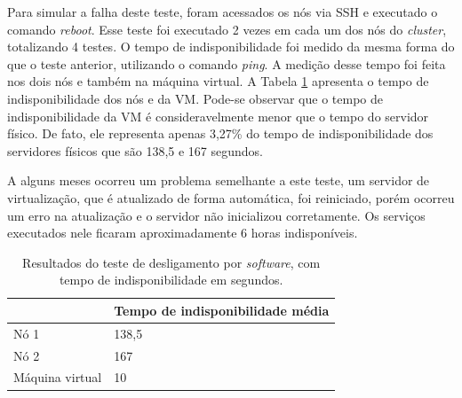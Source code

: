 Para simular a falha deste teste, foram acessados os nós via \ac{SSH} e executado o comando \textit{reboot}.
Esse teste foi executado 2 vezes em cada um dos nós do \textit{cluster}, totalizando 4 testes. O tempo de indisponibilidade foi medido da mesma 
forma do que o teste anterior, utilizando o comando \textit{ping}. A medição desse tempo foi feita nos dois nós e também na máquina virtual. 
A Tabela \ref{tab:teste2resultados} apresenta o tempo de indisponibilidade dos nós e da \ac{VM}. 
Pode-se observar que o tempo de indisponibilidade da \ac{VM} é consideravelmente menor que o tempo do servidor físico. De fato, ele representa 
apenas 3,27\% do tempo de indisponibilidade dos servidores físicos que são 138,5 e 167 segundos. 

A alguns meses ocorreu um problema semelhante a este teste, um servidor de virtualização, que é atualizado de forma automática, foi reiniciado, 
porém ocorreu um erro na atualização e o servidor não inicializou corretamente. Os serviços executados nele ficaram aproximadamente 
6 horas indisponíveis.


\begin{table}[h!]
\caption{Resultados do teste de desligamento por \textit{software}, com tempo de indisponibilidade em segundos.}
\small
\label{tab:teste2resultados}
\begin{center}
\begin{tabular}{|l|l|}\hline
 & \textbf{Tempo de indisponibilidade média} \\\hline %
Nó 1 & 138,5 \\\hline %
Nó 2 & 167 \\\hline %
Máquina virtual & 10 \\\hline %
\end{tabular}
\end{center}
\end{table}

